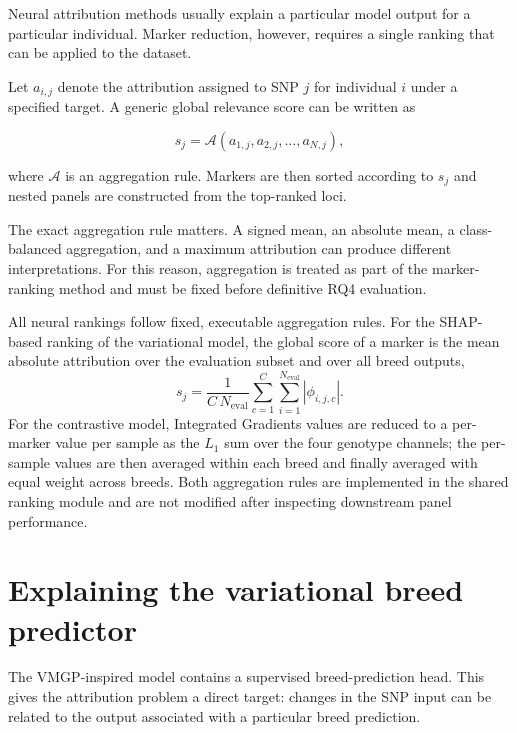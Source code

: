 Neural attribution methods usually explain a particular model output
for a particular individual. Marker reduction, however, requires a
single ranking that can be applied to the dataset.

Let $a_{i,j}$ denote the attribution assigned to SNP $j$ for
individual $i$ under a specified target. A generic global relevance
score can be written as

\begin{equation}
    s_j
    =
    \mathcal{A}
    \left(
        a_{1,j},
        a_{2,j},
        \ldots,
        a_{N,j}
    \right),
\end{equation}

where $\mathcal{A}$ is an aggregation rule. Markers are then sorted
according to $s_j$ and nested panels are constructed from the
top-ranked loci.

The exact aggregation rule matters. A signed mean, an absolute mean,
a class-balanced aggregation, and a maximum attribution can produce
different interpretations. For this reason, aggregation is treated as
part of the marker-ranking method and must be fixed before definitive
RQ4 evaluation.

All neural rankings follow fixed, executable aggregation rules. For the
SHAP-based ranking of the variational model, the global score of a
marker is the mean absolute attribution over the evaluation subset and
over all breed outputs,
\begin{equation}
    s_j
    =
    \frac{1}{C\,N_{\mathrm{eval}}}
    \sum_{c=1}^{C}
    \sum_{i=1}^{N_{\mathrm{eval}}}
    \left|
        \phi_{i,j,c}
    \right| .
\end{equation}
For the contrastive model, Integrated Gradients values are reduced to a
per-marker value per sample as the $L_1$ sum over the four genotype
channels; the per-sample values are then averaged within each breed and
finally averaged with equal weight across breeds. Both aggregation
rules are implemented in the shared ranking module and are not modified
after inspecting downstream panel performance.

\section{Explaining the variational breed predictor}
\label{sec:vmgp_marker_attribution}

The VMGP-inspired model contains a supervised breed-prediction head.
This gives the attribution problem a direct target: changes in the SNP
input can be related to the output associated with a particular breed
prediction.

